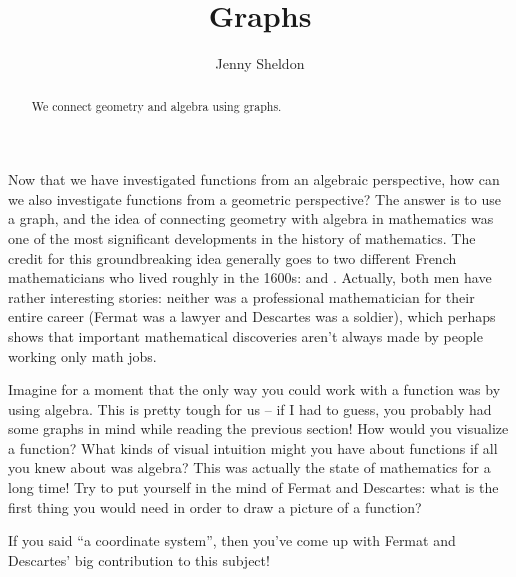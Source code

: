 \documentclass{ximera}
\title{Graphs}
\author{Jenny Sheldon}
\begin{document}
\begin{abstract}
We connect geometry and algebra using graphs.
\end{abstract}
\maketitle

Now that we have investigated functions from an algebraic perspective, how can we also investigate functions from a geometric perspective? The answer is to use a graph, and the idea of connecting geometry with algebra in mathematics was one of the most significant developments in the history of mathematics. The credit for this groundbreaking idea generally goes to two different French mathematicians who lived roughly in the 1600s:  and . Actually, both men have rather interesting stories: neither was a professional mathematician for their entire career (Fermat was a lawyer and Descartes was a soldier), which perhaps shows that important mathematical discoveries aren't always made by people working only math jobs.

Imagine for a moment that the only way you could work with a function was by using algebra. This is pretty tough for us -- if I had to guess, you probably had some graphs in mind while reading the previous section! How would you visualize a function? What kinds of visual intuition might you have about functions if all you knew about was algebra? This was actually the state of mathematics for a long time! Try to put yourself in the mind of Fermat and Descartes: what is the first thing you would need in order to draw a picture of a function?

If you said ``a coordinate system'', then you've come up with Fermat and Descartes' big contribution to this subject!
\end{document}
